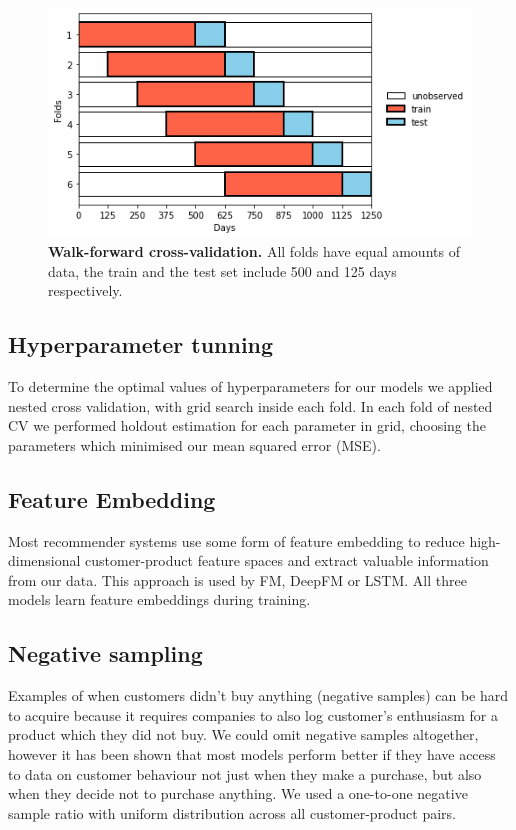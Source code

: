 \documentclass[fleqn,moreauthors,10pt]{ds_report}
\begin{document}
\begin{figure}[H]\centering
	\includegraphics[width=\linewidth]{cv.png}
	\caption{\textbf{Walk-forward cross-validation.} All folds have equal amounts of data, the train and the test set include 500 and 125 days respectively.}
	\label{cv}
\end{figure}

\subsection*{Hyperparameter tunning}
To determine the optimal values of hyperparameters for our models we applied nested cross validation, with grid search inside each fold. In each fold of nested CV we performed holdout estimation for each parameter in grid, choosing the parameters which minimised our mean squared error (MSE).

\subsection*{Feature Embedding}
Most recommender systems use some form of feature embedding to reduce high-dimensional customer-product feature spaces and extract valuable information from our data. This approach is used by FM, DeepFM or LSTM.
All three models learn feature embeddings during training.

\subsection*{Negative sampling}
Examples of when customers didn't buy anything (negative samples) can be hard to acquire because it requires companies to also log customer's enthusiasm for a product which they did not buy. We could omit negative samples altogether, however it has been shown that most models perform better if they have access to data on customer behaviour not just when they make a purchase, but also when they decide not to purchase anything. We used a one-to-one negative sample ratio with uniform distribution across all customer-product pairs. 
\end{document}

